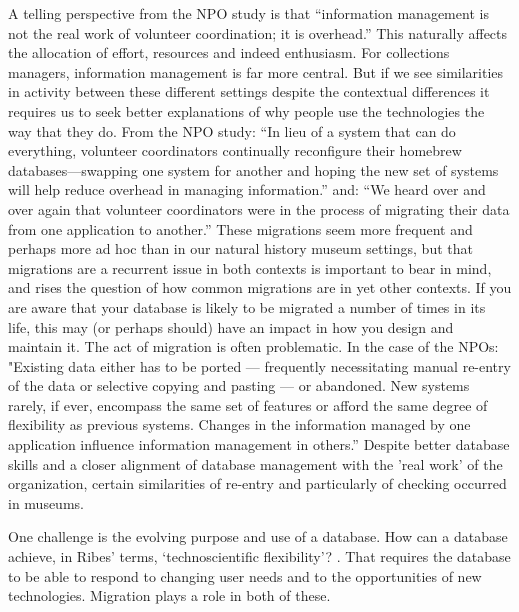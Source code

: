 A telling perspective from the NPO study is that “information management is not the real work of volunteer coordination; it is overhead.” This naturally affects the allocation of effort, resources and indeed enthusiasm. For collections managers, information management is far more central. But if we see similarities in activity between these different settings despite the contextual differences it requires us to seek better explanations of why people use the technologies the way that they do. From the NPO study: “In lieu of a system that can do everything, volunteer coordinators continually reconfigure their homebrew databases—swapping one system for another and hoping the new set of systems will help reduce overhead in managing information.”  and: “We heard over and over again that volunteer coordinators were in the process of migrating their data from one application to another.” These migrations seem more frequent and perhaps more ad hoc than in our natural history museum settings, but that migrations are a recurrent issue in both contexts is important to bear in mind, and rises the question of how common migrations are in yet other contexts. If you are aware that your database is likely to be migrated a number of times in its life, this may (or perhaps should) have an impact in how you design and maintain it. The act of migration is often problematic. In the case of the NPOs: "Existing data either has to be ported — frequently necessitating manual re-entry of the data or selective copying and pasting — or abandoned. New systems rarely, if ever, encompass the same set of features or afford the same degree of flexibility as previous systems. Changes in the information managed by one application influence information management in others.” Despite better database skills and a closer alignment of database management with the 'real work' of the organization, certain similarities of re-entry and particularly of checking occurred in museums.

One challenge is the evolving purpose and use of a database. How can a database achieve, in Ribes’ terms, ‘technoscientific flexibility’? \cite{ribes2014kernel} . That requires the database to be able to respond to changing user needs and to the opportunities of new technologies. Migration plays a role in both of these.

